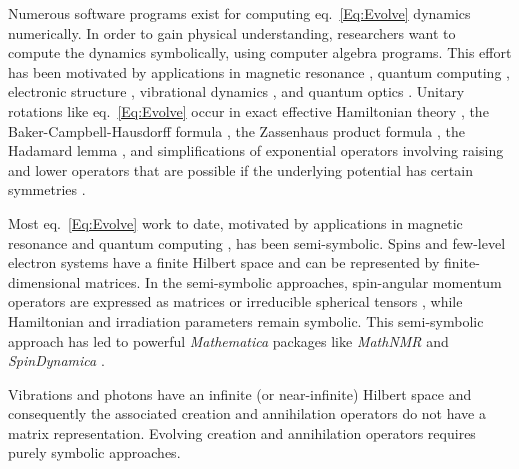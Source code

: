 Numerous software programs exist for computing eq.~\ref{Eq:Evolve} dynamics numerically.
In order to gain physical understanding, researchers want to compute the dynamics symbolically, using computer algebra programs.
This effort has been motivated by applications in magnetic resonance \cite{Shriver1991oct,Kanters1993jan,Guntert1993jan,Isbister1995dec,Rodriguez2001jan,Guntert2006aug,Anand2007dec,Kuprov2007feb,Filip2010nov}, 
quantum computing \cite{Loke2011oct,Chen2013mar,Loke2013dec},
electronic structure \cite{Zitko2011oct},
vibrational dynamics \cite{Aleixo2011aug}, and 
quantum optics \cite{Beskrovnyi1998jun,Nguyen1998dec}.
Unitary rotations like eq.~\ref{Eq:Evolve} occur in exact effective Hamiltonian theory \cite{Untidt2002jan,Siminovitch2004jan}, 
the Baker-Campbell-Hausdorff formula \cite{Weyrauch2009sep,Aleixo2011aug},
the Zassenhaus product formula \cite{Weyrauch2009sep,Aleixo2011aug, Casas2012nov}, 
the Hadamard lemma \cite{Aleixo2011aug}, and 
simplifications of exponential operators involving raising and lower operators that are possible if the underlying potential has certain symmetries \cite{Aleixo2011aug}.

Most eq.~\ref{Eq:Evolve} work to date, motivated by applications in magnetic resonance 
and quantum computing%
, has been semi-symbolic.
Spins and few-level electron systems have a finite Hilbert space and can be represented by finite-dimensional matrices.
In the semi-symbolic approaches, spin-angular momentum operators are expressed as matrices \cite{Isbister1995dec,Rodriguez2001jan,Loke2011oct,Chen2013mar,Loke2013dec,Bengs2017sep}
or irreducible spherical tensors \cite{Jerschow2005sep,Kuprov2007feb,Anand2007dec,Bengs2017sep},
while Hamiltonian and irradiation parameters remain symbolic. 
This semi-symbolic approach has led to powerful \emph{Mathematica} packages like \emph{MathNMR} \cite{Jerschow2005sep} and \emph{SpinDynamica} \cite{Bengs2017sep}.

Vibrations and photons have an infinite (or near-infinite) Hilbert space and consequently the associated creation and annihilation operators do not have a matrix representation.
Evolving creation and annihilation operators requires purely symbolic approaches.

